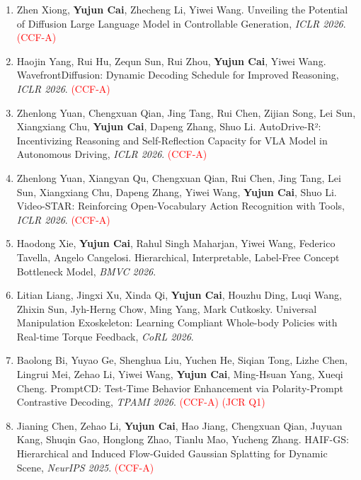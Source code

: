 \documentclass[11pt,letterpaper]{article}
\begin{document}
\begin{enumerate}
\item Zhen Xiong, \textbf{Yujun Cai}, Zhecheng Li, Yiwei Wang. Unveiling the Potential of Diffusion Large Language Model in Controllable Generation, \textit{ICLR 2026}. \textcolor{red}{(CCF-A)}

\item Haojin Yang, Rui Hu, Zequn Sun, Rui Zhou, \textbf{Yujun Cai}, Yiwei Wang. WavefrontDiffusion: Dynamic Decoding Schedule for Improved Reasoning, \textit{ICLR 2026}. \textcolor{red}{(CCF-A)}

\item Zhenlong Yuan, Chengxuan Qian, Jing Tang, Rui Chen, Zijian Song, Lei Sun, Xiangxiang Chu, \textbf{Yujun Cai}, Dapeng Zhang, Shuo Li. AutoDrive-R²: Incentivizing Reasoning and Self-Reflection Capacity for VLA Model in Autonomous Driving, \textit{ICLR 2026}. \textcolor{red}{(CCF-A)}

\item Zhenlong Yuan, Xiangyan Qu, Chengxuan Qian, Rui Chen, Jing Tang, Lei Sun, Xiangxiang Chu, Dapeng Zhang, Yiwei Wang, \textbf{Yujun Cai}, Shuo Li. Video-STAR: Reinforcing Open-Vocabulary Action Recognition with Tools, \textit{ICLR 2026}. \textcolor{red}{(CCF-A)}

\item Haodong Xie, \textbf{Yujun Cai}, Rahul Singh Maharjan, Yiwei Wang, Federico Tavella, Angelo Cangelosi. Hierarchical, Interpretable, Label-Free Concept Bottleneck Model, \textit{BMVC 2026}.

\item Litian Liang, Jingxi Xu, Xinda Qi, \textbf{Yujun Cai}, Houzhu Ding, Luqi Wang, Zhixin Sun, Jyh-Herng Chow, Ming Yang, Mark Cutkosky. Universal Manipulation Exoskeleton: Learning Compliant Whole-body Policies with Real-time Torque Feedback, \textit{CoRL 2026}.

\item Baolong Bi, Yuyao Ge, Shenghua Liu, Yuchen He, Siqian Tong, Lizhe Chen, Lingrui Mei, Zehao Li, Yiwei Wang, \textbf{Yujun Cai}, Ming-Hsuan Yang, Xueqi Cheng. PromptCD: Test-Time Behavior Enhancement via Polarity-Prompt Contrastive Decoding, \textit{TPAMI 2026}. \textcolor{red}{(CCF-A)} \textcolor{red}{(JCR Q1)}

\item Jianing Chen, Zehao Li, \textbf{Yujun Cai}, Hao Jiang, Chengxuan Qian, Juyuan Kang, Shuqin Gao, Honglong Zhao, Tianlu Mao, Yucheng Zhang. HAIF-GS: Hierarchical and Induced Flow-Guided Gaussian Splatting for Dynamic Scene, \textit{NeurIPS 2025}. \textcolor{red}{(CCF-A)}


\end{enumerate}
\end{document}
